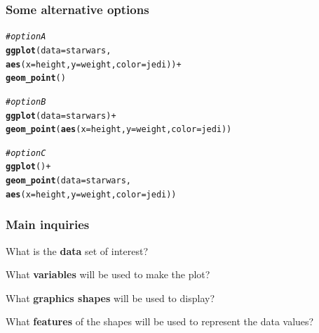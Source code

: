 \documentclass[12pt]{beamer}\usepackage[]{graphicx}\usepackage[]{color}
\makeatletter
\newcommand{\hlcom}[1]{\textcolor[rgb]{0.678,0.584,0.686}{\textit{#1}}}%
\newcommand{\hlopt}[1]{\textcolor[rgb]{0,0,0}{#1}}%
\newcommand{\hlstd}[1]{\textcolor[rgb]{0.345,0.345,0.345}{#1}}%
\newcommand{\hlkwc}[1]{\textcolor[rgb]{0.333,0.667,0.333}{#1}}%
\newcommand{\hlkwd}[1]{\textcolor[rgb]{0.737,0.353,0.396}{\textbf{#1}}}%
\newenvironment{kframe}{%
 \def\at@end@of@kframe{}%
 \ifinner\ifhmode%
  \def\at@end@of@kframe{\end{minipage}}%
  \begin{minipage}{\columnwidth}%
 \fi\fi%
 \def\FrameCommand##1{\hskip\@totalleftmargin \hskip-\fboxsep
 \colorbox{shadecolor}{##1}\hskip-\fboxsep
     \hskip-\linewidth \hskip-\@totalleftmargin \hskip\columnwidth}%
 \MakeFramed {\advance\hsize-\width
   \@totalleftmargin\z@ \linewidth\hsize
   \@setminipage}}%
 {\par\unskip\endMakeFramed%
 \at@end@of@kframe}
\newenvironment{knitrout}{}{} %
\makeatother
\begin{document}

\begin{frame}[fragile]
\frametitle{Some alternative options}
\begin{knitrout}\footnotesize
{}\color{fgcolor}\begin{kframe}
\begin{alltt}
\hlcom{# option A}
\hlkwd{ggplot}\hlstd{(}\hlkwc{data} \hlstd{= starwars,}
       \hlkwd{aes}\hlstd{(}\hlkwc{x} \hlstd{= height,} \hlkwc{y} \hlstd{= weight,} \hlkwc{color} \hlstd{= jedi))} \hlopt{+}
  \hlkwd{geom_point}\hlstd{()}
\end{alltt}
\end{kframe}
\end{knitrout}

\pause
\begin{knitrout}\footnotesize
{}\color{fgcolor}\begin{kframe}
\begin{alltt}
\hlcom{# option B}
\hlkwd{ggplot}\hlstd{(}\hlkwc{data} \hlstd{= starwars)} \hlopt{+}
  \hlkwd{geom_point}\hlstd{(}\hlkwd{aes}\hlstd{(}\hlkwc{x} \hlstd{= height,} \hlkwc{y} \hlstd{= weight,} \hlkwc{color} \hlstd{= jedi))}
\end{alltt}
\end{kframe}
\end{knitrout}

\pause
\begin{knitrout}\footnotesize
{}\color{fgcolor}\begin{kframe}
\begin{alltt}
\hlcom{# option C}
\hlkwd{ggplot}\hlstd{()} \hlopt{+}
  \hlkwd{geom_point}\hlstd{(}\hlkwc{data} \hlstd{= starwars,}
             \hlkwd{aes}\hlstd{(}\hlkwc{x} \hlstd{= height,} \hlkwc{y} \hlstd{= weight,} \hlkwc{color} \hlstd{= jedi))}
\end{alltt}
\end{kframe}
\end{knitrout}
\end{frame}


\begin{frame}
\frametitle{Main inquiries}

\bbi
  \item What is the \textbf{data} set of interest?
  \item What \textbf{variables} will be used to make the plot?
  \item What \textbf{graphics shapes} will be used to display?
  \item What \textbf{features} of the shapes will be used to represent the data values?
\ei
\eb

\end{frame}
\end{document}

